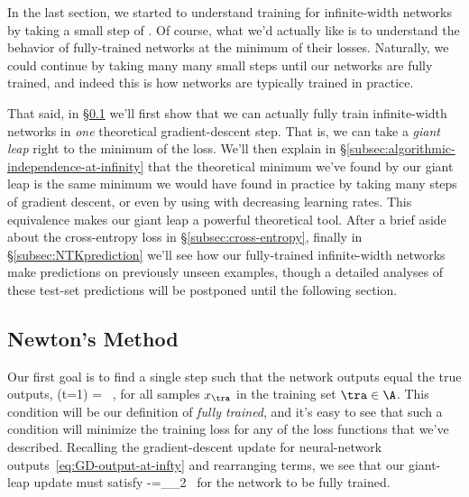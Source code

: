 \noindent{}In the last section, we started to understand training for infinite-width networks by taking a small step of . 
Of course, what we'd actually like is to understand the behavior of fully-trained networks at the minimum of their losses.
Naturally, we could continue by taking many many small steps until our networks are fully trained, and
indeed this is how networks are typically trained in practice. %




That said, in 
\S\ref{subsec:memorization-at-infinity} we'll first show that we can actually fully train infinite-width networks in \emph{one} theoretical gradient-descent step. That is, we can take a \emph{giant leap} right to the minimum of the loss. We'll then explain in \S\ref{subsec:algorithmic-independence-at-infinity} that the theoretical minimum
we've found by our giant leap is the same minimum we would have found in practice by taking many steps of gradient descent, or even by using  with decreasing learning rates. This equivalence makes our giant leap a powerful theoretical tool.
After a brief aside about the cross-entropy loss in \S\ref{subsec:cross-entropy},
finally in \S\ref{subsec:NTKprediction} we'll see how our fully-trained infinite-width networks make predictions on previously unseen examples, though a detailed analyses of these test-set predictions will be postponed until the following  section.%







\subsection{Newton's Method}\label{subsec:memorization-at-infinity}
Our first goal is to find a single step such that the network outputs equal the true outputs, 
\be\label{eq:fully-trained-condition}
(t=1) =  \, , 
\ee
for all samples $x_{\tra}$ in the training set $\tra\in\A$. This condition will be our definition of \emph{fully trained}, and it's easy to see that such a condition will minimize the training loss for any of the loss functions that we've described.
Recalling the gradient-descent update for neural-network outputs~\eqref{eq:GD-output-at-infty} and rearranging terms, we see that our giant-leap update must satisfy
\be\label{eq:what-we-want-rearranged}
-=\eta\sum_{\tra_2 \in\A}  \, 
\ee
for the network to be fully trained. 

